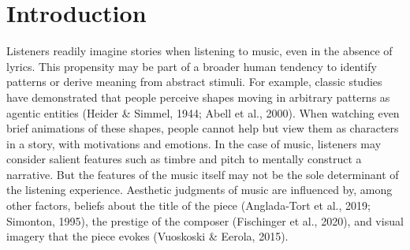 \documentclass[12pt,twoside]{reedthesis}
\begin{document}
	

  \mainmatter %
  \pagestyle{fancyplain} %


    \chapter*{Introduction}

\onehalfspacing

Listeners readily imagine stories when listening to music, even in the absence of lyrics. This propensity may be part of a broader human tendency to identify patterns or derive meaning from abstract stimuli. For example, classic studies have demonstrated that people perceive shapes moving in arbitrary patterns as agentic entities (Heider \& Simmel, 1944; Abell et al., 2000). When watching even brief animations of these shapes, people cannot help but view them as characters in a story, with motivations and emotions. In the case of music, listeners may consider salient features such as timbre and pitch to mentally construct a narrative. But the features of the music itself may not be the sole determinant of the listening experience. Aesthetic judgments of music are influenced by, among other factors, beliefs about the title of the piece (Anglada-Tort et al., 2019; Simonton, 1995), the prestige of the composer (Fischinger et al., 2020), and visual imagery that the piece evokes (Vuoskoski \& Eerola, 2015). 
\end{document}
